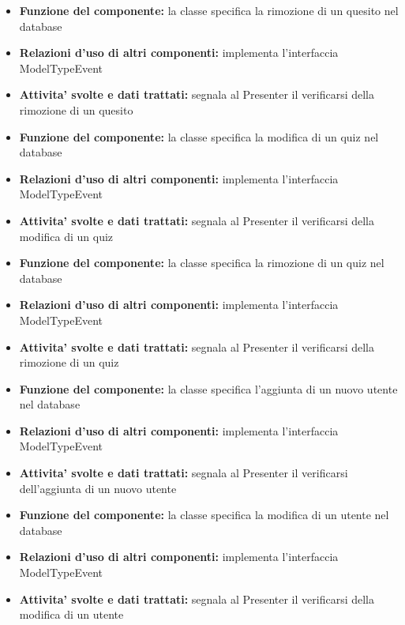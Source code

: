 \documentclass[a4paper,11pt]{article}
\begin{document}
			\begin{itemize}
		    	\item\textbf{Funzione del componente:} la classe specifica la rimozione di un quesito nel database
				\item\textbf{Relazioni d'uso di altri componenti:} implementa l'interfaccia ModelTypeEvent
				\item\textbf{Attivita' svolte e dati trattati:} segnala al Presenter il verificarsi della rimozione di un quesito
			\end{itemize}
			\begin{itemize}
		    	\item\textbf{Funzione del componente:} la classe specifica la modifica di un quiz nel database
				\item\textbf{Relazioni d'uso di altri componenti:} implementa l'interfaccia ModelTypeEvent
				\item\textbf{Attivita' svolte e dati trattati:} segnala al Presenter il verificarsi della modifica di un quiz
			\end{itemize}
			\begin{itemize}
		    	\item\textbf{Funzione del componente:} la classe specifica la rimozione di un quiz nel database
				\item\textbf{Relazioni d'uso di altri componenti:} implementa l'interfaccia ModelTypeEvent
				\item\textbf{Attivita' svolte e dati trattati:} segnala al Presenter il verificarsi della rimozione di un quiz
			\end{itemize}
			\begin{itemize}
		    	\item\textbf{Funzione del componente:} la classe specifica l'aggiunta di un nuovo utente nel database
				\item\textbf{Relazioni d'uso di altri componenti:} implementa l'interfaccia ModelTypeEvent
				\item\textbf{Attivita' svolte e dati trattati:} segnala al Presenter il verificarsi dell'aggiunta di un nuovo utente
			\end{itemize}
			\begin{itemize}
		    	\item\textbf{Funzione del componente:} la classe specifica la modifica di un utente nel database
				\item\textbf{Relazioni d'uso di altri componenti:} implementa l'interfaccia ModelTypeEvent
				\item\textbf{Attivita' svolte e dati trattati:} segnala al Presenter il verificarsi della modifica di un utente
			\end{itemize}
\end{document}
